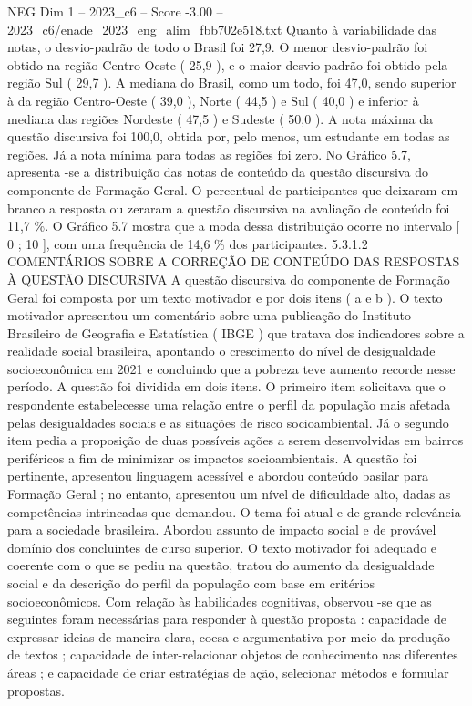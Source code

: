 \begin{textsample}{NEG Dim 1 – 2023\_c6 – Score -3.00 – 2023\_c6/enade\_2023\_eng\_alim\_fbb702e518.txt}
Quanto à variabilidade das notas, o desvio-padrão de todo o Brasil foi 27,9.
O menor desvio-padrão foi obtido na região Centro-Oeste ( 25,9 ), e o maior desvio-padrão foi obtido pela região Sul ( 29,7 ).
A mediana do Brasil, como um todo, foi 47,0, sendo superior à da região Centro-Oeste ( 39,0 ), Norte ( 44,5 ) e Sul ( 40,0 ) e inferior à mediana das regiões Nordeste ( 47,5 ) e Sudeste ( 50,0 ).
A nota máxima da questão discursiva foi 100,0, obtida por, pelo menos, um estudante em todas as regiões.
Já a nota mínima para todas as regiões foi zero.
No Gráfico 5.7, apresenta -se a distribuição das notas de conteúdo da questão discursiva do componente de Formação Geral.
O percentual de participantes que deixaram em branco a resposta ou zeraram a questão discursiva na avaliação de conteúdo foi 11,7 \%.
O Gráfico 5.7 mostra que a moda dessa distribuição ocorre no intervalo [ 0 ; 10 ], com uma frequência de 14,6 \% dos participantes. 5.3.1.2 COMENTÁRIOS SOBRE A CORREÇÃO DE CONTEÚDO DAS RESPOSTAS À QUESTÃO DISCURSIVA A questão discursiva do componente de Formação Geral foi composta por um texto motivador e por dois itens ( a e b ).
O texto motivador apresentou um comentário sobre uma publicação do Instituto Brasileiro de Geografia e Estatística ( IBGE ) que tratava dos indicadores sobre a realidade social brasileira, apontando o crescimento do nível de desigualdade socioeconômica em 2021 e concluindo que a pobreza teve aumento recorde nesse período.
A questão foi dividida em dois itens.
O primeiro item solicitava que o respondente estabelecesse uma relação entre o perfil da população mais afetada pelas desigualdades sociais e as situações de risco socioambiental.
Já o segundo item pedia a proposição de duas possíveis ações a serem desenvolvidas em bairros periféricos a fim de minimizar os impactos socioambientais.
A questão foi pertinente, apresentou linguagem acessível e abordou conteúdo basilar para Formação Geral ; no entanto, apresentou um nível de dificuldade alto, dadas as competências intrincadas que demandou.
O tema foi atual e de grande relevância para a sociedade brasileira.
Abordou assunto de impacto social e de provável domínio dos concluintes de curso superior.
O texto motivador foi adequado e coerente com o que se pediu na questão, tratou do aumento da desigualdade social e da descrição do perfil da população com base em critérios socioeconômicos.
Com relação às habilidades cognitivas, observou -se que as seguintes foram necessárias para responder à questão proposta : capacidade de expressar ideias de maneira clara, coesa e argumentativa por meio da produção de textos ; capacidade de inter-relacionar objetos de conhecimento nas diferentes áreas ; e capacidade de criar estratégias de ação, selecionar métodos e formular propostas.

\end{textsample}
